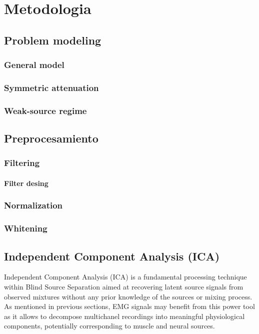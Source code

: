 \chapter{Metodologia}

\section{Problem modeling}
\subsection{General model}
\subsection{Symmetric attenuation}
\subsection{Weak-source regime}
\clearpage
\section{Preprocesamiento}
\subsection{Filtering}
\subsubsection{Filter desing}
\subsection{Normalization}
\subsection{Whitening}
\section{Independent Component Analysis (ICA)}

Independent Component Analysis (ICA) is a fundamental processing technique within Blind Source Separation aimed at recovering latent source signals from observed mixtures without any prior knowledge of the sources or mixing process. As mentioned in previous sections, EMG signals may benefit from this power tool as it allows to decompose multichanel recordings into meaningful physiological components, potentially corresponding to muscle and neural sources.

